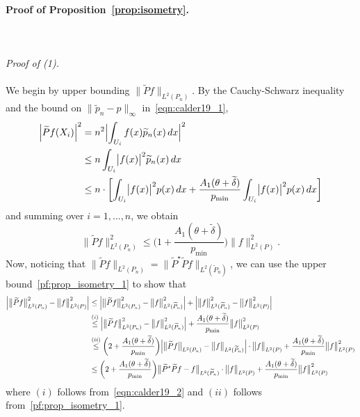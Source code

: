 \documentclass{article}
\newcommand{\1}{\mathbf{1}}
\newcommand{\Leb}{L}
\newcommand{\wt}[1]{\widetilde{#1}}
\theoremstyle{alden}
\theoremstyle{aldenthm}
\theoremstyle{definition}
\theoremstyle{remark}
\begin{document}
\paragraph{Proof of Proposition~\ref{prop:isometry}.}
\mbox{}\\
\mbox{}\\
\textit{Proof of (1).}
\mbox{}\\
\mbox{}\\
We begin by upper bounding $\bigl\|\wt{P}f\bigr\|_{\Leb^2(P_n)}$. By the Cauchy-Schwarz inequality and the bound on $\|\wt{p}_n - p\|_{\infty}$ in~\eqref{eqn:calder19_1},
\begin{align*}
\Bigl|\wt{P}f(X_i)\Bigr|^2 & = n^2 \Bigl|\int_{U_i} f(x) \wt{p}_n(x) \,dx\Bigr|^2 \\
& \leq n \int_{U_i} \bigl|f(x)\bigr|^2 \wt{p}_n(x) \,dx \\
& \leq n \cdot \biggl[\int_{U_i} \bigl|f(x)\bigr|^2 p(x) \,dx + \frac{A_1(\theta + \wt{\delta})}{p_{\min}} \int_{U_i} \bigl|f(x)\bigr|^2 p(x) \,dx\biggr]
\end{align*}
and summing over $i = 1,\ldots,n$, we obtain
\begin{equation}
\label{pf:prop_isometry_1}
\bigl\|\wt{P}f\bigr\|_{\Leb^2(P_n)}^2 \leq \biggl(1 + \frac{A_1(\theta + \wt{\delta})}{p_{\min}}\biggr) \bigl\|f\bigr\|_{\Leb^2(P)}^2.
\end{equation}
Now, noticing that $\bigl\|\wt{P}f\bigr\|_{\Leb^2(P_n)} = \bigl\|\wt{P}^{\star}\wt{P}f\bigr\|_{\Leb^2(\wt{P}_n)}$, we can use the upper bound~\eqref{pf:prop_isometry_1} to show that
\begin{align}
\Bigl|\bigl\|\wt{P}f\bigr\|_{\Leb^2(P_n)}^2 - \bigl\|f\bigr\|_{\Leb^2(P)}^2\Bigr| & \leq \Bigl|\bigl\|\wt{P}f\bigr\|_{\Leb^2(P_n)}^2 - \bigl\|f\bigr\|_{\Leb^2(\wt{P}_n)}^2\Bigr| + \Bigl|\bigl\|f\bigr\|_{\Leb^2(\wt{P}_n)}^2 - \bigl\|f\bigr\|_{\Leb^2(P)}^2\Bigr| \nonumber \\
& \overset{(i)}{\leq} \Bigl|\bigl\|\wt{P}f\bigr\|_{\Leb^2(P_n)}^2 - \bigl\|f\bigr\|_{\Leb^2(\wt{P}_n)}^2\Bigr|  + \frac{A_1(\theta + \wt{\delta})}{p_{\min}} \bigl\|f\bigr\|_{\Leb^2(P)}^2 \\
& \overset{(ii)}{\leq} \biggl(2 + \frac{A_1(\theta + \wt{\delta})}{p_{\min}}\biggr) \Bigl|\bigl\|\wt{P}f\bigr\|_{\Leb^2(P_n)} - \bigl\|f\bigr\|_{\Leb^2(\wt{P}_n)}\Bigr| \cdot \bigl\|f\bigr\|_{\Leb^2(P)} + \frac{A_1(\theta + \wt{\delta})}{p_{\min}} \bigl\|f\bigr\|_{\Leb^2(P)}^2 \nonumber \\
& \leq \biggl(2 + \frac{A_1(\theta + \wt{\delta})}{p_{\min}}\biggr) \bigl\|\wt{P}^{\star}\wt{P}f - f\bigr\|_{\Leb^2(\wt{P}_n)} \cdot \bigl\|f\bigr\|_{\Leb^2(P)} + \frac{A_1(\theta + \wt{\delta})}{p_{\min}} \bigl\|f\bigr\|_{\Leb^2(P)}^2 \label{pf:prop_isometry_2}
\end{align}
where $(i)$ follows from~\eqref{eqn:calder19_2} and $(ii)$ follows from~\eqref{pf:prop_isometry_1}. 
\end{document}

